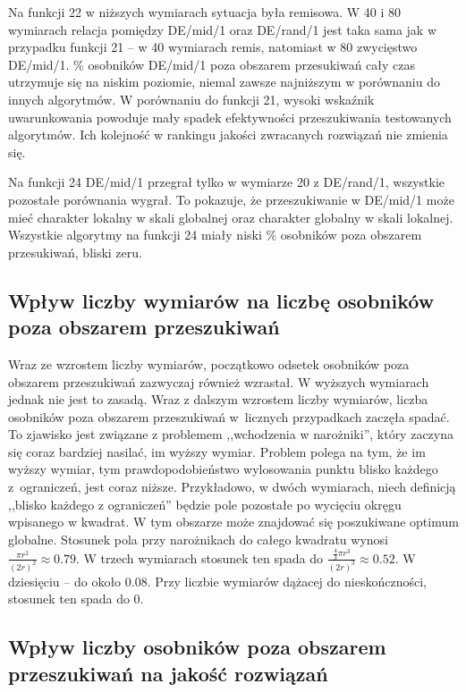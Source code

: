 \documentclass[a4paper,onecolumn,oneside,12pt,wide,floatssmall]{mwrep}
\theoremstyle{definition}
\theoremstyle{plain}%
\theoremstyle{remark}
\begin{document}
Na funkcji 22 w niższych wymiarach sytuacja była remisowa. 
W 40 i 80 wymiarach relacja pomiędzy DE/mid/1 oraz DE/rand/1 jest taka sama jak w przypadku funkcji 21
-- w 40 wymiarach remis, natomiast w 80 zwycięstwo DE/mid/1. \% osobników DE/mid/1 poza obszarem 
przesukiwań cały czas utrzymuje się na niskim poziomie, niemal zawsze najniższym w porównaniu do 
innych algorytmów.
W porównaniu do funkcji 21, wysoki wskaźnik uwarunkowania powoduje mały spadek efektywności
przeszukiwania testowanych algorytmów. Ich kolejność w rankingu jakości zwracanych rozwiązań nie 
zmienia się.

Na funkcji 24 DE/mid/1 przegrał tylko w wymiarze 20 z DE/rand/1, wszystkie pozostałe porównania 
wygrał. To pokazuje, że przeszukiwanie w DE/mid/1 może mieć charakter lokalny w skali globalnej 
oraz charakter globalny w skali lokalnej. Wszystkie algorytmy na funkcji 24 miały niski
\% osobników poza obszarem przesukiwań, bliski zeru. 

\subsection{Wpływ liczby wymiarów na liczbę osobników poza obszarem przeszukiwań}

Wraz ze wzrostem liczby wymiarów, początkowo odsetek osobników poza obszarem przeszukiwań zazwyczaj
również wzrastał. W wyższych wymiarach jednak nie jest to zasadą. 
Wraz z dalszym wzrostem liczby wymiarów,
liczba osobników poza obszarem przeszukiwań w~licznych przypadkach zaczęła spadać.
To zjawisko jest związane z problemem ,,wchodzenia w narożniki'', który zaczyna się coraz bardziej
nasilać, im wyższy wymiar. Problem polega na tym, że im wyższy wymiar, tym prawdopodobieństwo
wylosowania punktu blisko każdego z~ograniczeń, jest coraz niższe. Przykładowo, w dwóch wymiarach,
niech definicją ,,blisko każdego z ograniczeń'' będzie pole pozostałe po wycięciu 
okręgu wpisanego w kwadrat. W tym obszarze może znajdować się poszukiwane optimum globalne.
Stosunek pola przy narożnikach do całego kwadratu wynosi $\frac{\pi r^2}{(2r)^2} \approx 0.79$.
W trzech wymiarach stosunek ten spada do $\frac{\frac{4}{3}\pi r^3}{(2r)^3} \approx 0.52$.
W dziesięciu -- do około 0.08.
Przy liczbie wymiarów dążacej do nieskończności, stosunek ten spada do 0.

\subsection{Wpływ liczby osobników poza obszarem przeszukiwań na jakość rozwiązań}
\end{document}
